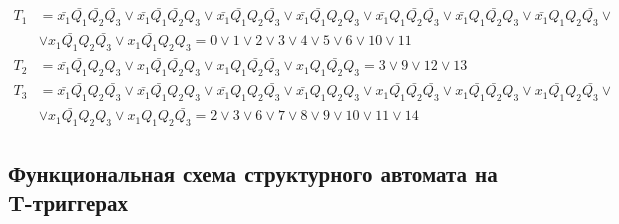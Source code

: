 \documentclass[12pt, a4paper]{article}
\begin{document}
\begin{align*}
  T_1 &= \bar{x_1}\bar{Q_1}\bar{Q_2}\bar{Q_3} \lor \bar{x_1}\bar{Q_1}\bar{Q_2}Q_3 \lor \bar{x_1}\bar{Q_1}Q_2\bar{Q_3} \lor \bar{x_1}\bar{Q_1}Q_2Q_3 \lor \bar{x_1}Q_1\bar{Q_2}\bar{Q_3} \lor \bar{x_1}Q_1\bar{Q_2}Q_3 \lor \bar{x_1}Q_1Q_2\bar{Q_3} \lor\\
  & \lor x_1\bar{Q_1}Q_2\bar{Q_3} \lor x_1\bar{Q_1}Q_2Q_3 = 0 \lor 1 \lor 2 \lor 3 \lor 4 \lor 5 \lor 6 \lor 10 \lor 11\\
  T_2 &= \bar{x_1}\bar{Q_1}Q_2Q_3 \lor x_1\bar{Q_1}\bar{Q_2}Q_3 \lor x_1Q_1\bar{Q_2}\bar{Q_3} \lor x_1Q_1\bar{Q_2}Q_3 = 3 \lor 9 \lor 12 \lor 13\\
  T_3 &= \bar{x_1}\bar{Q_1}Q_2\bar{Q_3} \lor \bar{x_1}\bar{Q_1}Q_2Q_3 \lor \bar{x_1}Q_1Q_2\bar{Q_3} \lor \bar{x_1}Q_1Q_2Q_3 \lor x_1\bar{Q_1}\bar{Q_2}\bar{Q_3} \lor x_1\bar{Q_1}\bar{Q_2}Q_3 \lor x_1\bar{Q_1}Q_2\bar{Q_3} \lor\\
  & \lor x_1\bar{Q_1}Q_2Q_3 \lor x_1Q_1Q_2\bar{Q_3} = 2 \lor 3 \lor 6 \lor 7 \lor 8 \lor 9 \lor 10 \lor 11 \lor 14
\end{align*}

\subsection*{Функциональная схема структурного автомата на T-триггерах}
\end{document}
